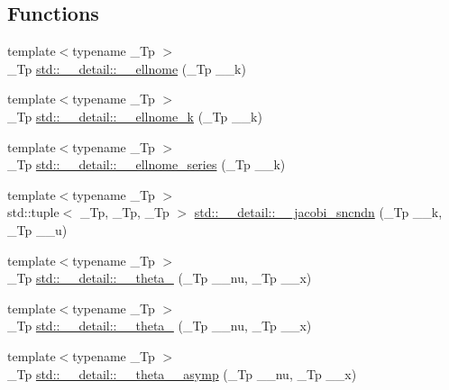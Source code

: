 \subsection*{Functions}
\begin{DoxyCompactItemize}
\item 
{\footnotesize template$<$typename \+\_\+\+Tp $>$ }\\\+\_\+\+Tp \hyperlink{namespacestd_1_1____detail_ac94c9cd28ee7973229e4a63d9b984711}{std\+::\+\_\+\+\_\+detail\+::\+\_\+\+\_\+ellnome} (\+\_\+\+Tp \+\_\+\+\_\+k)
\item 
{\footnotesize template$<$typename \+\_\+\+Tp $>$ }\\\+\_\+\+Tp \hyperlink{namespacestd_1_1____detail_a7631f367a1be34f98cec2021d588457b}{std\+::\+\_\+\+\_\+detail\+::\+\_\+\+\_\+ellnome\+\_\+k} (\+\_\+\+Tp \+\_\+\+\_\+k)
\item 
{\footnotesize template$<$typename \+\_\+\+Tp $>$ }\\\+\_\+\+Tp \hyperlink{namespacestd_1_1____detail_aec07b9131f90495831d349d22768425f}{std\+::\+\_\+\+\_\+detail\+::\+\_\+\+\_\+ellnome\+\_\+series} (\+\_\+\+Tp \+\_\+\+\_\+k)
\item 
{\footnotesize template$<$typename \+\_\+\+Tp $>$ }\\std\+::tuple$<$ \+\_\+\+Tp, \+\_\+\+Tp, \+\_\+\+Tp $>$ \hyperlink{namespacestd_1_1____detail_a98915d9bbc58112db7ffef2753313a63}{std\+::\+\_\+\+\_\+detail\+::\+\_\+\+\_\+jacobi\+\_\+sncndn} (\+\_\+\+Tp \+\_\+\+\_\+k, \+\_\+\+Tp \+\_\+\+\_\+u)
\item 
{\footnotesize template$<$typename \+\_\+\+Tp $>$ }\\\+\_\+\+Tp \hyperlink{namespacestd_1_1____detail_af7f54a82d2e5f0d8758cf53ebb2500e8}{std\+::\+\_\+\+\_\+detail\+::\+\_\+\+\_\+theta\+\_} (\+\_\+\+Tp \+\_\+\+\_\+nu, \+\_\+\+Tp \+\_\+\+\_\+x)
\item 
{\footnotesize template$<$typename \+\_\+\+Tp $>$ }\\\+\_\+\+Tp \hyperlink{namespacestd_1_1____detail_ae783991fe49b94dff4ac9e3ebb446d4f}{std\+::\+\_\+\+\_\+detail\+::\+\_\+\+\_\+theta\+\_} (\+\_\+\+Tp \+\_\+\+\_\+nu, \+\_\+\+Tp \+\_\+\+\_\+x)
\item 
{\footnotesize template$<$typename \+\_\+\+Tp $>$ }\\\+\_\+\+Tp \hyperlink{namespacestd_1_1____detail_ac7207ce23916e29df96b3b2159b55150}{std\+::\+\_\+\+\_\+detail\+::\+\_\+\+\_\+theta\+\_\+\_\+asymp} (\+\_\+\+Tp \+\_\+\+\_\+nu, \+\_\+\+Tp \+\_\+\+\_\+x)
\item 

\end{DoxyCompactItemize}
